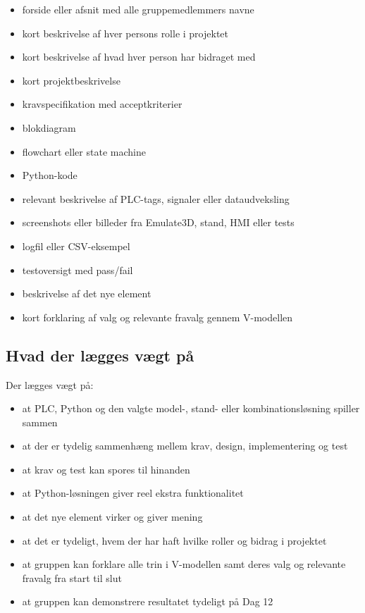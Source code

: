 \documentclass[12pt, a4paper]{article}
\begin{document}
\begin{itemize}[leftmargin=1.2em, itemsep=2pt]
  \item forside eller afsnit med alle gruppemedlemmers navne
  \item kort beskrivelse af hver persons rolle i projektet
  \item kort beskrivelse af hvad hver person har bidraget med
  \item kort projektbeskrivelse
  \item kravspecifikation med acceptkriterier
  \item blokdiagram
  \item flowchart eller state machine
  \item Python-kode
  \item relevant beskrivelse af PLC-tags, signaler eller dataudveksling
  \item screenshots eller billeder fra Emulate3D, stand, HMI eller tests
  \item logfil eller CSV-eksempel
  \item testoversigt med pass/fail
  \item beskrivelse af det nye element
  \item kort forklaring af valg og relevante fravalg gennem V-modellen
\end{itemize}

\subsection{Hvad der lægges vægt på}

\begin{tcolorbox}[defbox, title={\faTasks\quad Vurdering}] 
Der lægges vægt på:
\begin{itemize}[leftmargin=1.2em, itemsep=4pt]
  \item at PLC, Python og den valgte model-, stand- eller kombinationsløsning spiller sammen
  \item at der er tydelig sammenhæng mellem krav, design, implementering og test
  \item at krav og test kan spores til hinanden
  \item at Python-løsningen giver reel ekstra funktionalitet
  \item at det nye element virker og giver mening
  \item at det er tydeligt, hvem der har haft hvilke roller og bidrag i projektet
  \item at gruppen kan forklare alle trin i V-modellen samt deres valg og relevante fravalg fra start til slut
  \item at gruppen kan demonstrere resultatet tydeligt på Dag 12
\end{itemize}
\end{tcolorbox}
\end{document}
